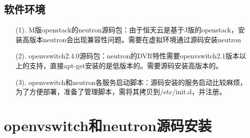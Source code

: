 \documentclass[a4paper,left=1.5cm,right=1.5cm,11pt]{article}
\begin{document}
\subsection{软件环境}
\begin{itemize}
	\item[(1).]M版openstack的neutron源码包：由于恒天云是基于J版的openstack，安装高版本neutron会出现兼容性问题。需要在虚拟环境通过源码安装neutron
	\item[(2).]openvswitch2.4.0源码包：neutron的DVR特性需要openvswitch2.1版本以上的支持，直接apt-get安装的是低版本的。需要源码安装高版本的。
	\item[(3).]openvswitch和neutron各服务启动脚本：源码安装的服务启动比较麻烦，为了方便部署，准备了管理脚本，需将其拷贝到/etc/init.d，并注册。
\end{itemize}
\section{openvswitch和neutron源码安装}
\end{document}
